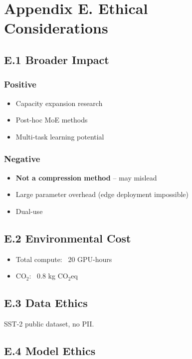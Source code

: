 \section{Appendix E. Ethical Considerations}

\subsection{E.1 Broader Impact}

\subsubsection{Positive}
\begin{itemize}
\item Capacity expansion research
\item Post-hoc MoE methods
\item Multi-task learning potential

\end{itemize}
\subsubsection{Negative}
\begin{itemize}
\item \textbf{Not a compression method} -- may mislead
\item Large parameter overhead (edge deployment impossible)
\item Dual-use

\end{itemize}
\subsection{E.2 Environmental Cost}

\begin{itemize}
\item Total compute: ~20 GPU-hours
\item CO$_2$: ~0.8 kg CO$_2$eq

\end{itemize}
\subsection{E.3 Data Ethics}

SST-2 public dataset, no PII.

\subsection{E.4 Model Ethics}

